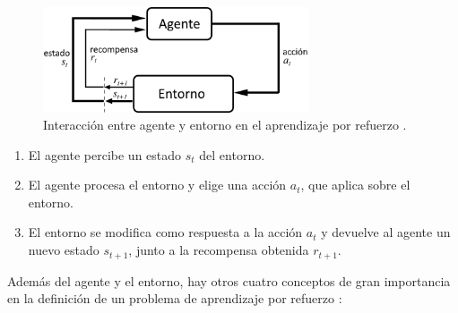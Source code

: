 \begin{figure}[h]
    \centering
    \includegraphics[width=0.7\textwidth]{imagenes/cap3/rl.png}
    \caption{Interacción entre agente y entorno en el aprendizaje por refuerzo \cite{Sutton1998}.}
    \label{fig:chap3-rl}
\end{figure}

\begin{enumerate}
\item El agente percibe un estado $s_t$ del entorno.
\item El agente procesa el entorno y elige una acción $a_t$, que aplica sobre el entorno.
\item El entorno se modifica como respuesta a la acción $a_t$ y devuelve al agente un nuevo estado $s_{t+1}$, junto a la recompensa obtenida $r_{t+1}$.
\end{enumerate}

Además del agente y el entorno, hay otros cuatro conceptos de gran importancia en la definición de un problema de aprendizaje por refuerzo \cite{Sutton1998}:

